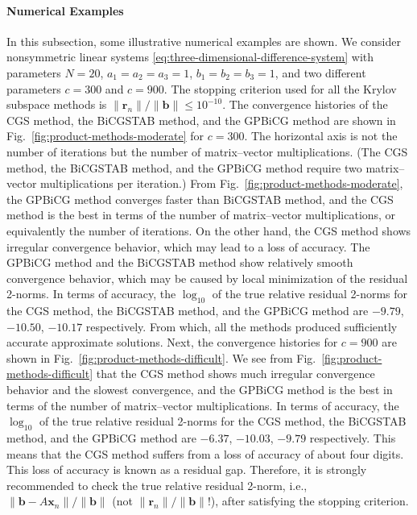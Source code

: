 \paragraph{{Numerical Examples}}\label{subsec:product-numerical-examples}\mbox{}\par
{In this subsection, some illustrative numerical examples are shown. We consider nonsymmetric linear systems \eqref{eq:three-dimensional-difference-system} with parameters $N=20$, $a_1=a_2=a_3=1$, $b_1=b_2=b_3=1$, and two different parameters $c=300$ and $c=900$. The stopping criterion used for all the Krylov subspace methods is $\|\bm r_n\|/\|\bm b\|\le10^{-10}$.}
{The convergence histories of the CGS method, the BiCGSTAB method, and the GPBiCG method are shown in Fig.\ \ref{fig:product-methods-moderate} for $c=300$. The horizontal axis is not the number of iterations but the number of matrix--vector multiplications. (The CGS method, the BiCGSTAB method, and the GPBiCG method require two matrix--vector multiplications per iteration.)}
{From Fig.\ \ref{fig:product-methods-moderate}, the GPBiCG method converges faster than BiCGSTAB method, and the CGS method is the best in terms of the number of matrix--vector multiplications, or equivalently the number of iterations. On the other hand, the CGS method shows irregular convergence behavior, which may lead to a loss of accuracy. The GPBiCG method and the BiCGSTAB method show relatively smooth convergence behavior, which may be caused by local minimization of the residual 2-norms. In terms of accuracy, the $\log_{10}$ of the true relative residual 2-norms for the CGS method, the BiCGSTAB method, and the GPBiCG method are $-9.79$, $-10.50$, $-10.17$ respectively. From which, all the methods produced sufficiently accurate approximate solutions.}
{Next, the convergence histories for $c=900$ are shown in Fig.\ \ref{fig:product-methods-difficult}. We see from Fig.\ \ref{fig:product-methods-difficult} that the CGS method shows much irregular convergence behavior and the slowest convergence, and the GPBiCG method is the best in terms of the number of matrix--vector multiplications. In terms of accuracy, the $\log_{10}$ of the true relative residual 2-norms for the CGS method, the BiCGSTAB method, and the GPBiCG method are $-6.37$, $-10.03$, $-9.79$ respectively. This means that the CGS method suffers from a loss of accuracy of about four digits. This loss of accuracy is known as a residual gap. Therefore, it is strongly recommended to check the true relative residual 2-norm, i.e., $\|\bm b-A\bm x_n\|/\|\bm b\|$ (not $\|\bm r_n\|/\|\bm b\|$!), after satisfying the stopping criterion.}
